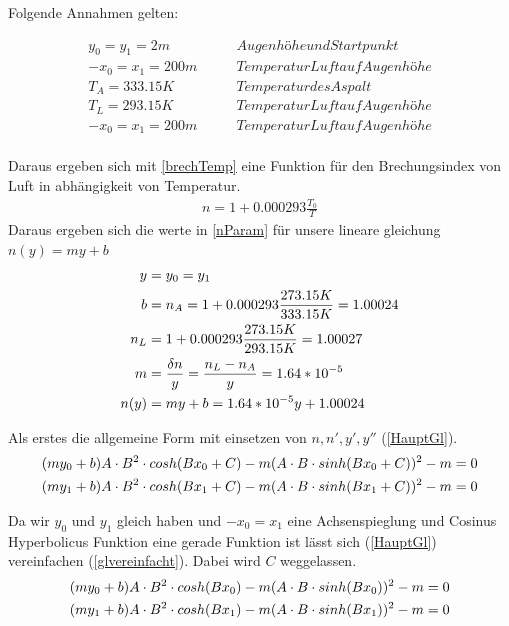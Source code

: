Folgende Annahmen gelten:


\begin{align}
	y_0=y_1=2 m \qquad& Augenhöhe und Startpunkt \\
	-x_0=x_1 = 200m \qquad& Temperatur Luft auf Augenhöhe \\
	T_A=333.15 K \qquad& Temperatur des Aspalt \\
	T_L=293.15 K \qquad& Temperatur Luft auf Augenhöhe \\
	-x_0=x_1 = 200m \qquad& Temperatur Luft auf Augenhöhe \\
\end{align}

Daraus ergeben sich mit \eqref{brechTemp} eine Funktion für den Brechungsindex von Luft in abhängigkeit von Temperatur.
\begin{align}
	n=1+0.000293\frac{T_0}{T}
	\label{brechTemp}
\end{align}
Daraus ergeben sich die werte in \eqref{nParam} für unsere lineare gleichung $n(y)=my+b$
\begin{align}
	y&=y_0=y_1 \notag \\
	b&=n_A=1+0.000293\frac{273.15 K}{333.15 K} = 1.00024 \notag \\
	n_L&=1+0.000293\frac{273.15 K}{293.15 K} = 1.00027 \notag \\
	m&=\frac{\delta n}{y}=\frac{n_L-n_A}{y}=1.64*10^{-5} \notag \\
	n(y)&=my+b=1.64*10^{-5}y +1.00024
	\label{nParam}
\end{align}

Als erstes die allgemeine Form mit einsetzen von $n,n',y',y''$ (\eqref{HauptGl}).
\begin{align}
	(my_0+b)A\cdot B^2\cdot cosh(B x_0 + C)-m (A\cdot B\cdot sinh(B x_0 + C))^2-m &= 0\notag \\
	(my_1+b)A\cdot B^2\cdot cosh(B x_1 + C)-m (A\cdot B\cdot sinh(B x_1 + C))^2-m &=0 \label{HauptGl}
\end{align}

Da wir $y_0$ und $y_1$ gleich haben und $-x_0=x_1$ eine Achsenspieglung und Cosinus Hyperbolicus Funktion eine gerade Funktion ist lässt sich (\eqref{HauptGl}) vereinfachen (\eqref{glvereinfacht}). Dabei wird $C$ weggelassen.
\begin{align}
	(my_0+b)A\cdot B^2\cdot cosh(B x_0 )-m (A\cdot B\cdot sinh(B x_0 ))^2-m &= 0\notag \\
	(my_1+b)A\cdot B^2\cdot cosh(B x_1 )-m (A\cdot B\cdot sinh(B x_1 ))^2-m &=0 \label{glvereinfacht}
\end{align}

